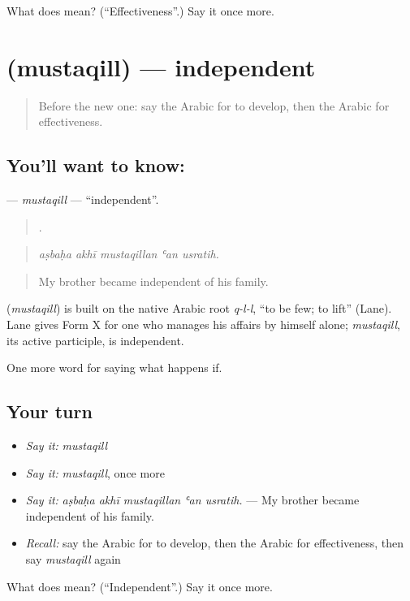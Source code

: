 \begin{tcolorbox}[breakable,colback=teal!4,colframe=teal!35!black,title={Before you move on}]
What does  mean? (\textquotedblleft{}Effectiveness\textquotedblright{}.) Say it once more.
\end{tcolorbox}
\section[\texorpdfstring{\ar{مستقل} (mustaqill)}{مستقل (mustaqill)}]{ (mustaqill) — independent}

\label{lesson:AR-C418-mustaqill}



\begin{quote}
Before the new one: say the Arabic for to develop, then the Arabic for effectiveness.
\end{quote}

\subsection*{You'll want to know: }
\textbf{} — \emph{mustaqill} — \textquotedblleft{}independent\textquotedblright{}.

\begin{quote}
    .
\end{quote}

\begin{quote}
\emph{aṣbaḥa akhī mustaqillan ʿan usratih.}
\end{quote}

\begin{quote}
My brother became independent of his family.
\end{quote}

\begin{cousinweb}
\textbf{} (\emph{mustaqill}) is built on the native Arabic root \emph{q-l-l}, \textquotedblleft{}to be few; to lift\textquotedblright{} (Lane). Lane gives Form X for one who manages his affairs by himself alone; \emph{mustaqill}, its active participle, is independent.
\end{cousinweb}

\begin{grammarlens}[title={What you've built}]
One more word for saying what happens if.
\end{grammarlens}

\subsection*{Your turn}
\begin{itemize}
\raggedright
  \item \emph{Say it:} \emph{mustaqill}
  \item \emph{Say it:} \emph{mustaqill}, once more
  \item \emph{Say it:} \emph{aṣbaḥa akhī mustaqillan ʿan usratih.} — My brother became independent of his family.
  \item \emph{Recall:} say the Arabic for to develop, then the Arabic for effectiveness, then say \emph{mustaqill} again
\end{itemize}

\begin{tcolorbox}[breakable,colback=teal!4,colframe=teal!35!black,title={Before you move on}]
What does  mean? (\textquotedblleft{}Independent\textquotedblright{}.) Say it once more.
\end{tcolorbox}
